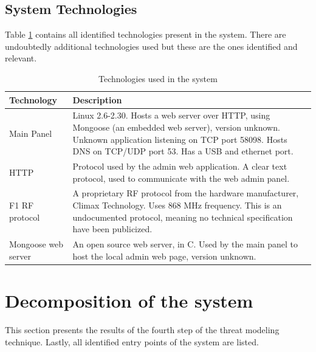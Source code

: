 \subsection{System Technologies}
Table \ref{tb:system-technologies} contains all identified technologies present in the system. There are undoubtedly additional technologies used but these are the ones identified and relevant.
\begin{table}[!ht]
    \centering
    \begin{tabularx}{\textwidth}{l X}
        \hline
        \textbf{Technology}  & \textbf{Description}
        \\ \hline
        Main Panel & Linux 2.6-2.30. Hosts a web server over HTTP, using Mongoose (an embedded web server), version unknown. Unknown application listening on TCP port 58098. Hosts DNS on TCP/UDP port 53. Has a USB and ethernet port.
        \\ \hline
        HTTP  & Protocol used by the admin web application. A clear text protocol, used to communicate with the web admin panel.
        \\ \hline
        F1 RF protocol  & A proprietary \gls{RF} protocol from the hardware manufacturer, Climax Technology. Uses 868 MHz frequency. This is an undocumented protocol, meaning no technical specification have been publicized.
        \\ \hline
        Mongoose web server  & An open source web server, in C. Used by the main panel to host the local admin web page, version unknown.
        \\ \hline
    \end{tabularx}
    \caption{Technologies used in the system}
    \label{tb:system-technologies}
\end{table}

\section{Decomposition of the system}
This section presents the results of the fourth step of the threat modeling technique. Lastly, all identified entry points of the system are listed.

